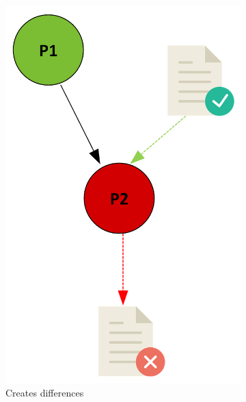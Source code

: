 \documentclass[a4paper,num-refs]{oup-contemporary}
\begin{document}
\begin{figure}
\begin{subfigure}{0.4\linewidth}
    \includegraphics[scale=0.34]{images/red.png}
    \caption{Creates differences}
    \label{fig:red}
    \end{subfigure}
    \hfill
    \begin{subfigure}{0.4\linewidth}

\end{subfigure}
\end{figure}
\end{document}
